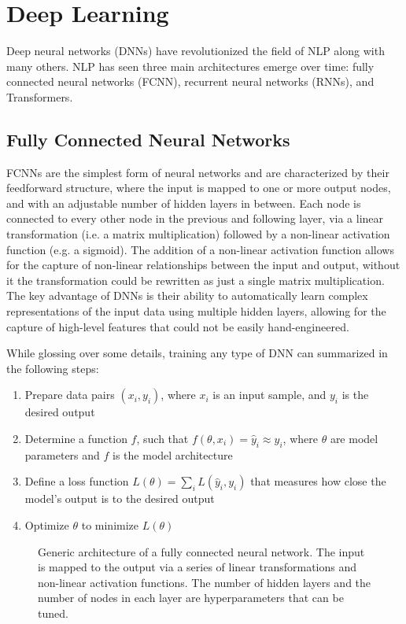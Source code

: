 \section{Deep Learning}
Deep neural networks (DNNs) have revolutionized the field of NLP along with many others. NLP has seen three main architectures emerge over time: fully connected neural networks (FCNN), recurrent neural networks (RNNs), and Transformers.

\subsection{Fully Connected Neural Networks}
FCNNs are the simplest form of neural networks and are characterized by their feedforward structure, where the input is mapped to one or more output nodes, and with an adjustable number of hidden layers in between.
Each node is connected to every other node in the previous and following layer, via a linear transformation (i.e. a matrix multiplication) followed by a non-linear activation function (e.g. a sigmoid).
The addition of a non-linear activation function allows for the capture of non-linear relationships between the input and output, without it the transformation could be rewritten as just a single matrix multiplication.
The key advantage of DNNs is their ability to automatically learn complex representations of the input data using multiple hidden layers, allowing for the capture of high-level features that could not be easily hand-engineered.

While glossing over some details, training any type of DNN can summarized in the following steps:
\begin{enumerate}
    \item Prepare data pairs $(x_i, y_i)$, where $x_i$ is an input sample, and $y_i$ is the desired output
    \item Determine a function $f$, such that $f(\theta, x_i) = \hat{y}_i \approx y_i$, where $\theta$ are model parameters and $f$ is the model architecture
    \item Define a loss function $L(\theta) = \sum_i L(\hat{y}_i, y_i)$ that measures how close the model's output is to the desired output
    \item Optimize $\theta$ to minimize $L(\theta)$
\end{enumerate}


\begin{figure}[h]
    
    \caption{Generic architecture of a fully connected neural network. The input is mapped to the output via a series of linear transformations and non-linear activation functions. The number of hidden layers and the number of nodes in each layer are hyperparameters that can be tuned.}
    \label{fig:model_architecture}
\end{figure}

